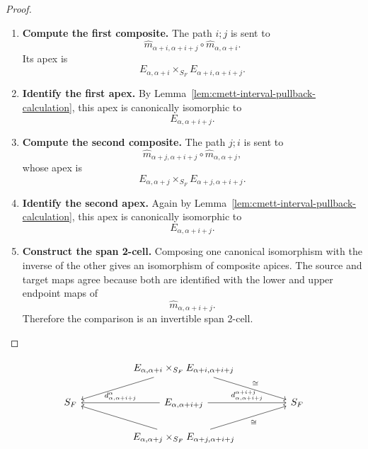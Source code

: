 \begin{proof}
    \leavevmode
    \begin{enumerate}
        \item \textbf{Compute the first composite.}
        The path \(i;j\) is sent to
        \[
            \widehat m_{\alpha+i,\alpha+i+j}
            \circ
            \widehat m_{\alpha,\alpha+i}.
        \]
        Its apex is
        \[
            E_{\alpha,\alpha+i}
            \times_{S_F}
            E_{\alpha+i,\alpha+i+j}.
        \]

        \item \textbf{Identify the first apex.}
        By Lemma~\ref{lem:cmett-interval-pullback-calculation}, this apex is
        canonically isomorphic to
        \[
            E_{\alpha,\alpha+i+j}.
        \]

        \item \textbf{Compute the second composite.}
        The path \(j;i\) is sent to
        \[
            \widehat m_{\alpha+j,\alpha+i+j}
            \circ
            \widehat m_{\alpha,\alpha+j},
        \]
        whose apex is
        \[
            E_{\alpha,\alpha+j}
            \times_{S_F}
            E_{\alpha+j,\alpha+i+j}.
        \]

        \item \textbf{Identify the second apex.}
        Again by Lemma~\ref{lem:cmett-interval-pullback-calculation}, this
        apex is canonically isomorphic to
        \[
            E_{\alpha,\alpha+i+j}.
        \]

        \item \textbf{Construct the span 2-cell.}
        Composing one canonical isomorphism with the inverse of the other
        gives an isomorphism of composite apices. The source and target maps
        agree because both are identified with the lower and upper endpoint
        maps of
        \[
            \widehat m_{\alpha,\alpha+i+j}.
        \]
        Therefore the comparison is an invertible span 2-cell.
    \end{enumerate}
\end{proof}

\[
\begin{tikzcd}[column sep=huge]
&
E_{\alpha,\alpha+i}
    \times_{S_F}
E_{\alpha+i,\alpha+i+j}
    \arrow[dl]
    \arrow[dr,"\cong"]
&
\\
S_F
&
E_{\alpha,\alpha+i+j}
    \arrow[l,"d_{\alpha,\alpha+i+j}^{\alpha}"']
    \arrow[r,"d_{\alpha,\alpha+i+j}^{\alpha+i+j}"]
&
S_F
\\
&
E_{\alpha,\alpha+j}
    \times_{S_F}
E_{\alpha+j,\alpha+i+j}
    \arrow[ul]
    \arrow[ur,"\cong"']
&
\end{tikzcd}
\]

